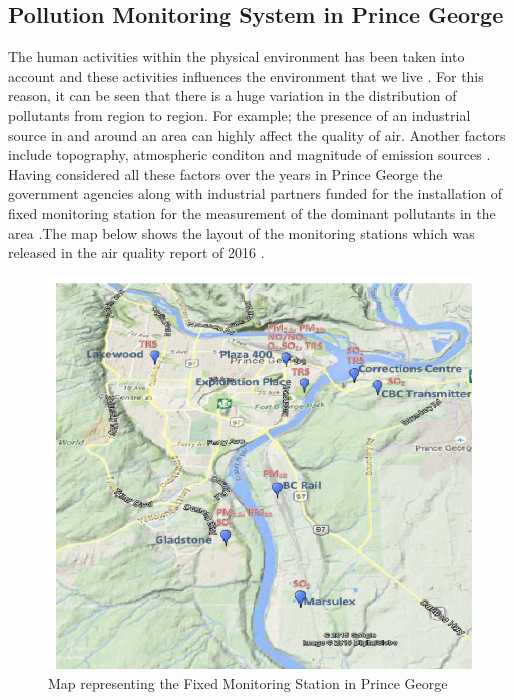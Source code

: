\subsection{Pollution Monitoring System in Prince George}

 The human activities within the physical environment has been taken into account and these activities influences the environment that we live \cite{Manisalidis2020}. For this reason, it can be seen that there is a huge variation in the distribution of pollutants from region to region. For example; the presence of an industrial source in and around an area can highly affect the quality of air. Another factors include topography, atmospheric conditon and magnitude of emission sources \cite{Prevention2000}. Having considered all these factors over the years in Prince George the government agencies along with industrial partners funded for the installation of fixed monitoring station for the measurement of the dominant pollutants in the area \cite{Authority2011}.The map below shows the layout of the monitoring stations which was released in the air quality report of 2016 \cite{Environment2016}.

 
\begin{figure}[h]
  \begin{center}
  \includegraphics[scale=0.80]{./images/figure19.png}
  \end{center}
 
  \caption{Map representing the Fixed Monitoring Station in Prince George \cite{Environment2016}}
  
  \label{Map}
\end{figure}

